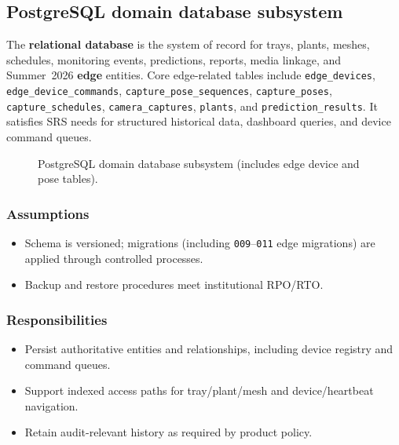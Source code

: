 \subsection{PostgreSQL domain database subsystem}

The \textbf{relational database} is the system of record for trays, plants, meshes, schedules, monitoring events, predictions, reports, media linkage, and Summer~2026 \textbf{edge} entities. Core edge-related tables include \texttt{edge\_devices}, \texttt{edge\_device\_commands}, \texttt{capture\_pose\_sequences}, \texttt{capture\_poses}, \texttt{capture\_schedules}, \texttt{camera\_captures}, \texttt{plants}, and \texttt{prediction\_results}. It satisfies SRS needs for structured historical data, dashboard queries, and device command queues.

\begin{figure}[H]
\centering
{}
\caption{PostgreSQL domain database subsystem (includes edge device and pose tables).}
\label{fig:data-pg}
\end{figure}

\subsubsection{Assumptions}
\begin{itemize}
  \item Schema is versioned; migrations (including \texttt{009}--\texttt{011} edge migrations) are applied through controlled processes.
  \item Backup and restore procedures meet institutional RPO/RTO.
\end{itemize}

\subsubsection{Responsibilities}
\begin{itemize}
  \item Persist authoritative entities and relationships, including device registry and command queues.
  \item Support indexed access paths for tray/plant/mesh and device/heartbeat navigation.
  \item Retain audit-relevant history as required by product policy.
\end{itemize}

